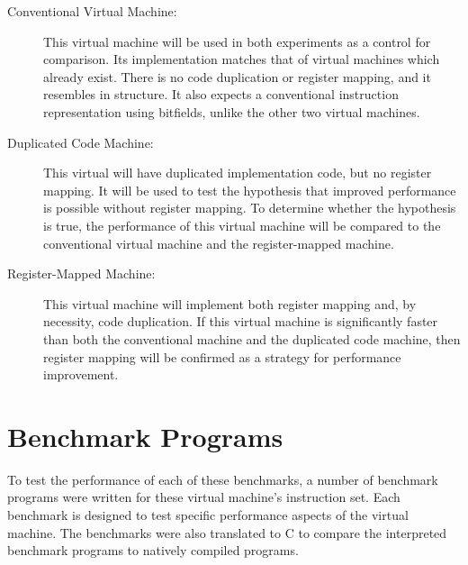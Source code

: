 	\begin{description}
		\item[Conventional Virtual Machine:] This virtual machine will be used in both experiments as a control for comparison. Its implementation matches that of virtual machines which already exist. There is no code duplication or register mapping, and it resembles  in structure. It also expects a conventional instruction representation using bitfields, unlike the other two virtual machines.
		\item[Duplicated Code Machine:] This virtual will have duplicated implementation code, but no register mapping. It will be used to test the hypothesis that improved performance is possible without register mapping. To determine whether the hypothesis is true, the performance of this virtual machine will be compared to the conventional virtual machine and the register-mapped machine.
		\item[Register-Mapped Machine:] This virtual machine will implement both register mapping and, by necessity,  code duplication. If this virtual machine is significantly faster than both the conventional machine and the duplicated code machine, then register mapping will be confirmed as a strategy for performance improvement.
	\end{description}
	
	\section{Benchmark Programs}
	To test the performance of each of these benchmarks, a number of benchmark programs were written for these virtual machine's instruction set. Each benchmark is designed to test specific performance aspects of the virtual machine. The benchmarks were also translated to C to compare the interpreted benchmark programs to natively compiled programs.
	
